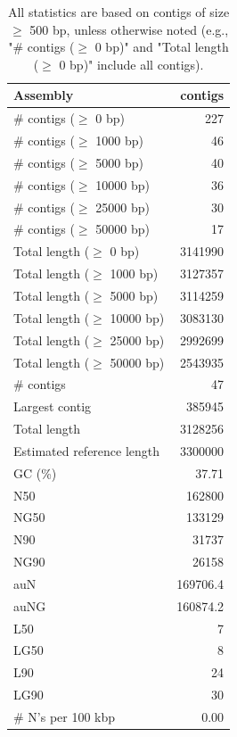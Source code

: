 \documentclass[12pt,a4paper]{article}
\begin{document}
\begin{table}[ht]
\begin{center}
\caption{All statistics are based on contigs of size $\geq$ 500 bp, unless otherwise noted (e.g., "\# contigs ($\geq$ 0 bp)" and "Total length ($\geq$ 0 bp)" include all contigs).}
\begin{tabular}{|l*{1}{|r}|}
\hline
Assembly & contigs \\ \hline
\# contigs ($\geq$ 0 bp) & 227 \\ \hline
\# contigs ($\geq$ 1000 bp) & 46 \\ \hline
\# contigs ($\geq$ 5000 bp) & 40 \\ \hline
\# contigs ($\geq$ 10000 bp) & 36 \\ \hline
\# contigs ($\geq$ 25000 bp) & 30 \\ \hline
\# contigs ($\geq$ 50000 bp) & 17 \\ \hline
Total length ($\geq$ 0 bp) & 3141990 \\ \hline
Total length ($\geq$ 1000 bp) & 3127357 \\ \hline
Total length ($\geq$ 5000 bp) & 3114259 \\ \hline
Total length ($\geq$ 10000 bp) & 3083130 \\ \hline
Total length ($\geq$ 25000 bp) & 2992699 \\ \hline
Total length ($\geq$ 50000 bp) & 2543935 \\ \hline
\# contigs & 47 \\ \hline
Largest contig & 385945 \\ \hline
Total length & 3128256 \\ \hline
Estimated reference length & 3300000 \\ \hline
GC (\%) & 37.71 \\ \hline
N50 & 162800 \\ \hline
NG50 & 133129 \\ \hline
N90 & 31737 \\ \hline
NG90 & 26158 \\ \hline
auN & 169706.4 \\ \hline
auNG & 160874.2 \\ \hline
L50 & 7 \\ \hline
LG50 & 8 \\ \hline
L90 & 24 \\ \hline
LG90 & 30 \\ \hline
\# N's per 100 kbp & 0.00 \\ \hline
\end{tabular}
\end{center}
\end{table}
\end{document}
